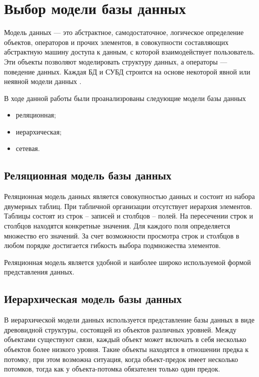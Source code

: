 \section{Выбор модели базы данных}
Модель данных — это абстрактное, самодостаточное, логическое определение объектов, операторов и прочих элементов, в совокупности составляющих абстрактную машину доступа к данным, с которой взаимодействует пользователь. Эти объекты позволяют моделировать структуру данных, а операторы — поведение данных. Каждая БД и СУБД строится на основе некоторой явной или неявной модели данных \cite{2}.

В ходе данной работы были проанализрованы следующие модели базы данных
\begin{itemize}
	\item реляционная;
	\item иерархическая;
	\item сетевая.
\end{itemize}

\subsection{Реляционная модель базы данных}
Реляционная модель данных является совокупностью данных и состоит из набора двумерных таблиц. При табличной организации отсутствует иерархия элементов. Таблицы состоят из строк – записей и столбцов – полей. На пересечении строк и столбцов находятся конкретные значения. Для каждого поля определяется множество его значений. За счет возможности просмотра строк и столбцов в любом порядке достигается гибкость выбора подмножества элементов.

Реляционная модель является удобной и наиболее широко используемой формой представления данных.


\subsection{Иерархическая модель базы данных}
В иерархической модели данных используется представление базы данных в виде древовидной структуры, состоящей из объектов различных уровней. Между объектами существуют связи, каждый объект может включать в себя несколько объектов более низкого уровня. Такие объекты находятся в отношении предка к потомку, при этом возможна ситуация, когда объект-предок имеет несколько потомков, тогда как у объекта-потомка обязателен только один предок.

